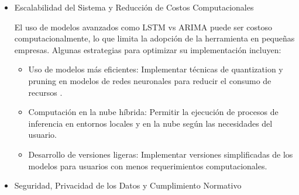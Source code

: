 \documentclass[12pt,letterpaper,oneside]{report}
\renewcommand{\_}{\UnderscoreOriginal\allowbreak}
\begin{document}
\begin{itemize}
\item Escalabilidad del Sistema y Reducción de Costos Computacionales

El uso de modelos avanzados como LSTM vs ARIMA \parencite{SiamiNamini2018} puede ser costoso computacionalmente, lo que limita la adopción de la herramienta en pequeñas empresas. Algunas estrategias para optimizar su implementación incluyen:
\begin{itemize}
\item Uso de modelos más eficientes: Implementar técnicas de quantization y pruning en modelos de redes neuronales para reducir el consumo de recursos \parencite{Liang2021,Bibi2024}.
\item Computación en la nube híbrida: Permitir la ejecución de procesos de inferencia en entornos locales y en la nube según las necesidades del usuario.
\item Desarrollo de versiones ligeras: Implementar versiones simplificadas de los modelos para usuarios con menos requerimientos computacionales.
\end{itemize}

\item Seguridad, Privacidad de los Datos y Cumplimiento Normativo


\end{itemize}
\end{document}
